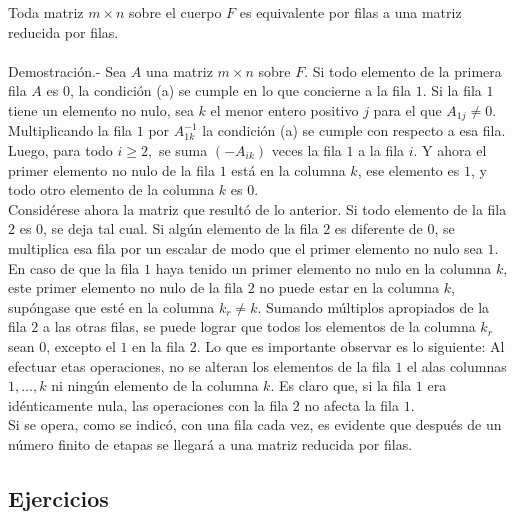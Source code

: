 \begin{teo}
    Toda matriz $m\times n$ sobre el cuerpo $F$ es equivalente por filas a una matriz reducida por filas.\\\\
    Demostración.-\; Sea $A$ una matriz $m\times n$ sobre $F$. Si todo elemento de la primera fila $A$ es $0$, la condición (a) se cumple en lo que concierne a la fila $1$. Si la fila $1$ tiene un elemento no nulo, sea $k$ el menor entero positivo $j$ para el que $A_{1j}\neq 0$. Multiplicando la fila $1$ por $A_{1k}^{-1}$ la condición (a) se cumple con respecto a esa fila. Luego, para todo $i\geq 2,$ se suma $(-A_{ik})$ veces la fila $1$  a la fila $i$. Y ahora el primer elemento no nulo de la fila $1$ está en la columna $k$, ese elemento es $1$, y todo otro elemento de la columna $k$ es $0$.\\
    Considérese ahora la matriz que resultó de lo anterior. Si todo elemento de la fila $2$ es $0$, se deja tal cual. Si algún elemento de la fila $2$ es diferente de $0$, se multiplica esa fila por un escalar de modo que el primer elemento no nulo sea $1$. En caso de que la fila $1$ haya tenido un primer elemento no nulo en la columna $k$, este primer elemento no nulo de la fila $2$ no puede estar en la columna $k$, supóngase que esté en la columna $k_r\neq k$. Sumando múltiplos apropiados de la fila $2$ a las otras filas, se puede lograr que todos los elementos de la columna $k_r$ sean $0$, excepto el $1$ en la fila $2$. Lo que es importante observar es lo siguiente: Al efectuar etas operaciones, no se alteran los elementos de la fila $1$ el alas columnas $1,\ldots, k$ ni ningún elemento de la columna $k$. Es claro que, si la fila $1$ era idénticamente nula, las operaciones con la fila $2$ no afecta la fila $1$.\\
    Si se opera, como se indicó, con una fila cada vez, es evidente que después de un número finito de etapas se llegará a una matriz reducida por filas.
\end{teo}
\vspace{.5cm}

\subsection*{Ejercicios}


